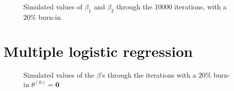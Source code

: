 \begin{figure}
    \caption{Simulated values of $\beta_1$ and $\beta_2$ through the 10000 iterations, with a $20\%$ burn-in}%
    \label{fig:chain_50k_02_06}%
\end{figure}


\section{Multiple logistic regression}

\begin{figure}%
    \centering
    \qquad
    \caption{Simulated values of the $\beta$'s through the iterations with a $20\%$ burn-in $\theta^{\left(0\right)} = \mathbf{0}$}%
    \label{fig:chain_50k_02_06_theta1}%
\end{figure}



